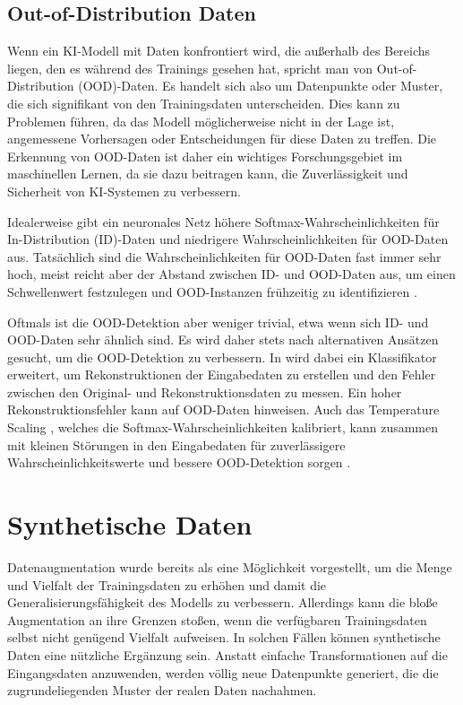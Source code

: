 \subsection{Out-of-Distribution Daten} \label{subsec:ood}

Wenn ein KI-Modell mit Daten konfrontiert wird, die außerhalb des Bereichs liegen, den es während des Trainings gesehen hat, spricht man von Out-of-Distribution (OOD)-Daten. Es handelt sich also um Datenpunkte oder Muster, die sich signifikant von den Trainingsdaten unterscheiden. Dies kann zu Problemen führen, da das Modell möglicherweise nicht in der Lage ist, angemessene Vorhersagen oder Entscheidungen für diese Daten zu treffen. Die Erkennung von OOD-Daten ist daher ein wichtiges Forschungsgebiet im maschinellen Lernen, da sie dazu beitragen kann, die Zuverlässigkeit und Sicherheit von KI-Systemen zu verbessern.

Idealerweise gibt ein neuronales Netz höhere Softmax-Wahrscheinlichkeiten für In-Distribution (ID)-Daten und niedrigere Wahrscheinlichkeiten für OOD-Daten aus. Tatsächlich sind die Wahrscheinlichkeiten für OOD-Daten fast immer sehr hoch, meist reicht aber der Abstand zwischen ID- und OOD-Daten aus, um einen Schwellenwert festzulegen und OOD-Instanzen frühzeitig zu identifizieren \parencite{Hendrycks2018baselineooddetection}.

Oftmals ist die OOD-Detektion aber weniger trivial, etwa wenn sich ID- und OOD-Daten sehr ähnlich sind. Es wird daher stets nach alternativen Ansätzen gesucht, um die OOD-Detektion zu verbessern. In \parencite{Hendrycks2018baselineooddetection} wird dabei ein Klassifikator erweitert, um Rekonstruktionen der Eingabedaten zu erstellen und den Fehler zwischen den Original- und Rekonstruktionsdaten zu messen. Ein hoher Rekonstruktionsfehler kann auf OOD-Daten hinweisen. Auch das Temperature Scaling \parencite{Guo2017tempscaling}, welches die Softmax-Wahrscheinlichkeiten kalibriert, kann zusammen mit kleinen Störungen in den Eingabedaten für zuverlässigere Wahrscheinlichkeitswerte und bessere OOD-Detektion sorgen \parencite{Liang2020odin}.

\section{Synthetische Daten} \label{sec:synt-data}

Datenaugmentation wurde bereits als eine Möglichkeit vorgestellt, um die Menge und Vielfalt der Trainingsdaten zu erhöhen und damit die Generalisierungsfähigkeit des Modells zu verbessern. Allerdings kann die bloße Augmentation an ihre Grenzen stoßen, wenn die verfügbaren Trainingsdaten selbst nicht genügend Vielfalt aufweisen. In solchen Fällen können synthetische Daten eine nützliche Ergänzung sein. Anstatt einfache Transformationen auf die Eingangsdaten anzuwenden, werden völlig neue Datenpunkte generiert, die die zugrundeliegenden Muster der realen Daten nachahmen.

